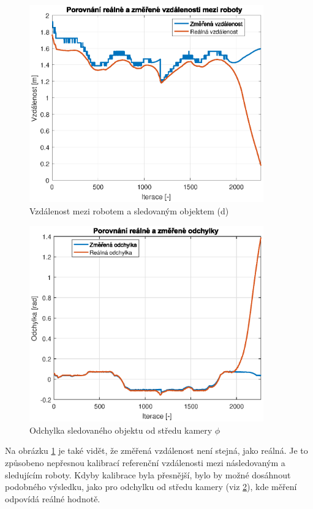 \documentclass[twoside]{ctuthesis}
\theoremstyle{plain}
\theoremstyle{definition}
\theoremstyle{note}
\begin{document}
\begin{figure}[hbt]
	\caption{Vzdálenost mezi robotem a sledovaným objektem (d)}
	
	\label{dist}
	\includegraphics[width=0.9\textwidth]{images/5/dist.eps}
\end{figure}


\begin{figure}[hbt]
	\caption{Odchylka sledovaného objektu od středu kamery $\phi$}
	
	\label{odch}
	\includegraphics[width=0.9\textwidth]{images/5/odchylka.eps}
\end{figure}
Na obrázku \ref{dist} je také vidět, že změřená vzdálenost není stejná, jako reálná. Je to způsobeno nepřesnou kalibrací referenční vzdálenosti mezi následovaným a sledujícím roboty. Kdyby kalibrace byla přesnější, bylo by možné dosáhnout podobného výsledku, jako pro odchylku od středu kamery (viz \ref{odch}), kde měření odpovídá reálné hodnotě.
\end{document}

